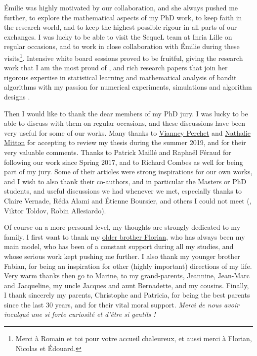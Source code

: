 \begin{acknowledgements}
Émilie was highly motivated by our collaboration, and she always pushed me further, to explore the mathematical aspects of my PhD work, to keep faith in the research world, and to keep the highest possible rigour in all parts of our exchanges.
I was lucky to be able to visit the SequeL team at Inria Lille on regular occasions, and to work in close collaboration with Émilie during these visits\footnote{Merci à Romain et toi pour votre accueil chaleureux, et aussi merci à Florian, Nicolas et Édouard.}. Intensive white board sessions proved to be fruitful, giving the research work that I am the most proud of \cite{Besson2018ALT}, and rich research papers that join her rigorous expertise in statistical learning and mathematical analysis of bandit algorithms with my passion for numerical experiments, simulations and algorithm designs \cite{Besson2018ALT,Besson2018DoublingTricks,Besson2019GLRT}.

Then I would like to thank the dear members of my PhD jury.
I was lucky to be able to discuss with them on regular occasions, and these discussions have been very useful for some of our works.
Many thanks to \href{https://sites.google.com/site/vianneyperchet/}{Vianney Perchet} and \href{http://researchers.lille.inria.fr/~mitton/}{Nathalie Mitton} for accepting to review my thesis during the summer 2019, and for their very valuable comments.
Thanks to Patrick Maillé and Raphaël Féraud for following our work since Spring 2017,
and to Richard Combes as well for being part of my jury.
Some of their articles were strong inspirations for our own works, and I wish to also thank their co-authors, and in particular the Masters or PhD students, and useful discussions we had whenever we met, especially thanks to Claire Vernade, Réda Alami and Étienne Boursier, and others I could not meet (\eg, Viktor Toldov, Robin Allesiardo).

Of course on a more personal level, my thoughts are strongly dedicated to my family.
I first want to thank my \href{https://paris-sorbonne.academia.edu/FBesson}{older brother Florian}, who has always been my main model, who has been of a constant support during all my studies, and whose serious work kept pushing me further. I also thank my younger brother Fabian, for being an inspiration for other (highly important) directions of my life.
Very warm thanks then go to Marine, to my grand-parents, Jeannine, Jean-Marc and Jacqueline, my uncle Jacques and aunt Bernadette, and my cousins.
Finally, I thank sincerely my parents, Christophe and Patricia, for being the best parents since the last 30 years, and for their vital moral support. \emph{Merci de nous avoir inculqué une si forte curiosité et d'être si gentils !}


\end{acknowledgements}
